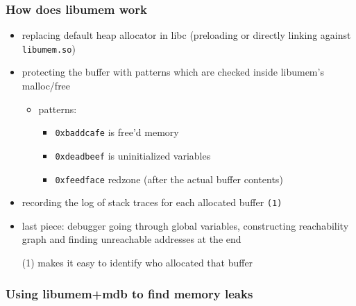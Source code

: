 \subsubsection{How does libumem work}

\begin{itemize}
\item replacing default heap allocator in libc (preloading or directly
   linking against \texttt{libumem.so})
\item protecting the buffer with patterns which are checked inside
  libumem's malloc/free
  \begin{itemize}
  \item patterns:
    \begin{itemize}
    \item \texttt{0xbaddcafe} is free'd memory
    \item \texttt{0xdeadbeef} is uninitialized variables
    \item \texttt{0xfeedface} redzone (after the actual buffer contents)
    \end{itemize}
  \end{itemize}
\item recording the log of stack traces for each allocated buffer \texttt{(1)}
\item last piece: debugger going through global variables, 
   constructing reachability graph and finding unreachable addresses at
   the end
\end{itemize}

\begin{itemize}
  \item[(1)] makes it easy to identify who allocated that buffer
\end{itemize}

\subsubsection{Using libumem+mdb to find memory leaks}

